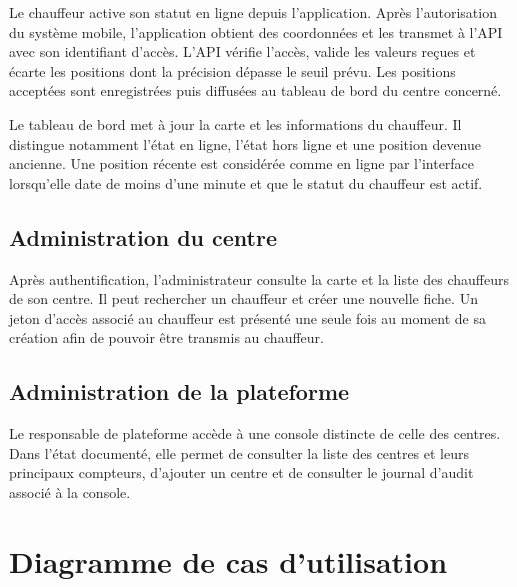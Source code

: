 \documentclass[11pt,a4paper,oneside]{report}
\begin{document}
Le chauffeur active son statut en ligne depuis l'application. Après
l'autorisation du système mobile, l'application obtient des coordonnées et les
transmet à l'API avec son identifiant d'accès. L'API vérifie l'accès, valide les
valeurs reçues et écarte les positions dont la précision dépasse le seuil
prévu. Les positions acceptées sont enregistrées puis diffusées au tableau de
bord du centre concerné.

Le tableau de bord met à jour la carte et les informations du chauffeur. Il
distingue notamment l'état en ligne, l'état hors ligne et une position devenue
ancienne. Une position récente est considérée comme en ligne par l'interface
lorsqu'elle date de moins d'une minute et que le statut du chauffeur est actif.

\subsection{Administration du centre}

Après authentification, l'administrateur consulte la carte et la liste des
chauffeurs de son centre. Il peut rechercher un chauffeur et créer une nouvelle
fiche. Un jeton d'accès associé au chauffeur est présenté une seule fois au
moment de sa création afin de pouvoir être transmis au chauffeur.

\subsection{Administration de la plateforme}

Le responsable de plateforme accède à une console distincte de celle des
centres. Dans l'état documenté, elle permet de consulter la liste des centres
et leurs principaux compteurs, d'ajouter un centre et de consulter le journal
d'audit associé à la console.

\section{Diagramme de cas d'utilisation}
\end{document}
